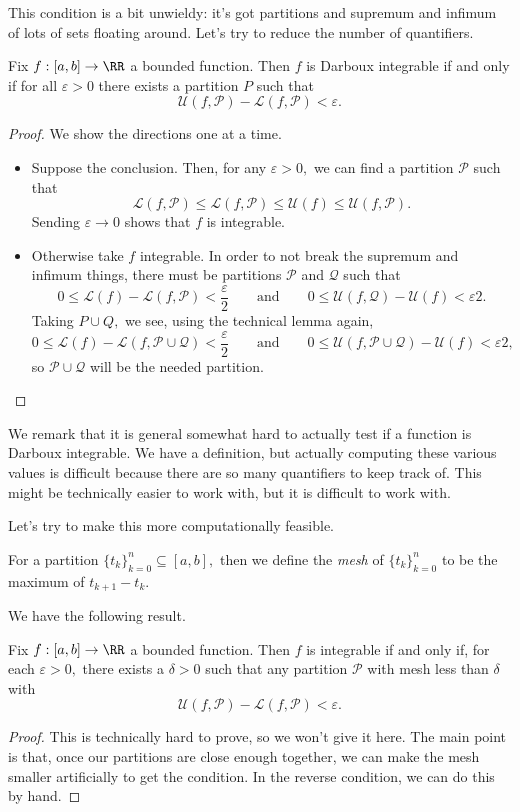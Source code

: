 This condition is a bit unwieldy: it's got partitions and supremum and infimum of lots of sets floating around. Let's try to reduce the number of quantifiers.
\begin{proposition}
	Fix $f:[a,b]\to\RR$ a bounded function. Then $f$ is Darboux integrable if and only if for all $\varepsilon>0$ there exists a partition $P$ such that
	\[\mathcal U(f,\mathcal P)-\mathcal L(f,\mathcal P)<\varepsilon.\]
\end{proposition}
\begin{proof}
	We show the directions one at a time.
	\begin{itemize}
		\item Suppose the conclusion. Then, for any $\varepsilon>0,$ we can find a partition $\mathcal P$ such that
		\[\mathcal L(f,\mathcal P)\le\mathcal L(f,\mathcal P)\le\mathcal U(f)\le\mathcal U(f,\mathcal P).\]
		Sending $\varepsilon\to0$ shows that $f$ is integrable.
		\item Otherwise take $f$ integrable. In order to not break the supremum and infimum things, there must be partitions $\mathcal P$ and $\mathcal Q$ such that
		\[0\le\mathcal L(f)-\mathcal L(f,\mathcal P)<\frac\varepsilon2\qquad\text{and}\qquad0\le\mathcal U(f,\mathcal Q)-\mathcal U(f)<\varepsilon2.\]
		Taking $P\cup Q,$ we see, using the technical lemma again,
		\[0\le\mathcal L(f)-\mathcal L(f,\mathcal P\cup\mathcal Q)<\frac\varepsilon2\qquad\text{and}\qquad0\le\mathcal U(f,\mathcal P\cup\mathcal Q)-\mathcal U(f)<\varepsilon2,\]
		so $\mathcal P\cup\mathcal Q$ will be the needed partition.
		\qedhere
	\end{itemize}
\end{proof}
We remark that it is general somewhat hard to actually test if a function is Darboux integrable. We have a definition, but actually computing these various values is difficult because there are so many quantifiers to keep track of. This might be technically easier to work with, but it is difficult to work with.

Let's try to make this more computationally feasible.
\begin{definition}
	For a partition $\{t_k\}_{k=0}^n\subseteq[a,b],$ then we define the \textit{mesh} of $\{t_k\}_{k=0}^n$ to be the maximum of $t_{k+1}-t_k.$
\end{definition}
We have the following result.
\begin{proposition}
	Fix $f:[a,b]\to\RR$ a bounded function. Then $f$ is integrable if and only if, for each $\varepsilon>0,$ there exists a $\delta>0$ such that any partition $\mathcal P$ with mesh less than $\delta$ with
	\[\mathcal U(f,\mathcal P)-\mathcal L(f,\mathcal P)<\varepsilon.\]
\end{proposition}
\begin{proof}
	This is technically hard to prove, so we won't give it here. The main point is that, once our partitions are close enough together, we can make the mesh smaller artificially to get the condition. In the reverse condition, we can do this by hand.
\end{proof}

